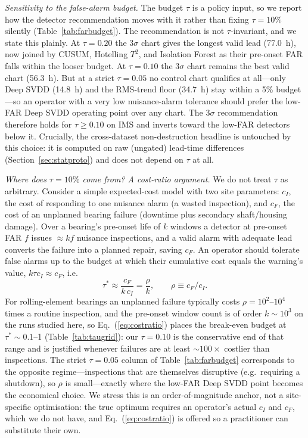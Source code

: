 \documentclass[IJPHM, 2026, 0]{PHMSociety}
\begin{document}
\emph{Sensitivity to the false-alarm budget.} The budget $\tau$ is a policy input, so we report how the detector recommendation moves with it rather than fixing $\tau=10\%$ silently (Table~\ref{tab:farbudget}). The recommendation is not $\tau$-invariant, and we state this plainly. At $\tau=0.20$ the $3\sigma$ chart gives the longest valid lead (77.0~h), now joined by CUSUM, Hotelling $T^2$, and Isolation Forest as their pre-onset FAR falls within the looser budget. At $\tau=0.10$ the $3\sigma$ chart remains the best valid chart (56.3~h). But at a strict $\tau=0.05$ no control chart qualifies at all---only Deep SVDD (14.8~h) and the RMS-trend floor (34.7~h) stay within a 5\% budget---so an operator with a very low nuisance-alarm tolerance should prefer the low-FAR Deep SVDD operating point over any chart. The $3\sigma$ recommendation therefore holds for $\tau \ge 0.10$ on IMS and inverts toward the low-FAR detectors below it. Crucially, the cross-dataset non-destruction headline is untouched by this choice: it is computed on raw (ungated) lead-time differences (Section~\ref{sec:statproto}) and does not depend on $\tau$ at all.

\emph{Where does $\tau=10\%$ come from? A cost-ratio argument.} We do not treat $\tau$ as arbitrary. Consider a simple expected-cost model with two site parameters: $c_I$, the cost of responding to one nuisance alarm (a wasted inspection), and $c_F$, the cost of an unplanned bearing failure (downtime plus secondary shaft/housing damage). Over a bearing's pre-onset life of $k$ windows a detector at pre-onset FAR $f$ issues ${\approx} kf$ nuisance inspections, and a valid alarm with adequate lead converts the failure into a planned repair, saving $c_F$. An operator should tolerate false alarms up to the budget at which their cumulative cost equals the warning's value, $k\tau c_I \approx c_F$, i.e.
\begin{equation}
\tau^* \approx \frac{c_F}{k\,c_I} = \frac{\rho}{k}, \qquad \rho \equiv c_F/c_I.
\label{eq:costratio}
\end{equation}
For rolling-element bearings an unplanned failure typically costs $\rho = 10^2$--$10^4$ times a routine inspection, and the pre-onset window count is of order $k \sim 10^3$ on the runs studied here, so Eq.~(\ref{eq:costratio}) places the break-even budget at $\tau^* \sim 0.1$--1 (Table~\ref{tab:taugrid}): our $\tau=0.10$ is the conservative end of that range and is justified whenever failures are at least ${\sim}100\times$ costlier than inspections. The strict $\tau=0.05$ column of Table~\ref{tab:farbudget} corresponds to the opposite regime---inspections that are themselves disruptive (e.g.\ requiring a shutdown), so $\rho$ is small---exactly where the low-FAR Deep SVDD point becomes the economical choice. We stress this is an order-of-magnitude anchor, not a site-specific optimisation: the true optimum requires an operator's actual $c_I$ and $c_F$, which we do not have, and Eq.~(\ref{eq:costratio}) is offered so a practitioner can substitute their own.
\end{document}
